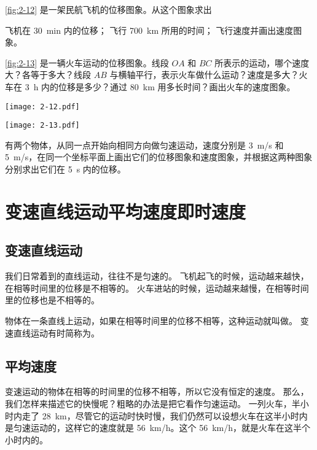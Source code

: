 \begin{Practice}
\begin{question}
  \item \cref{fig:2-12} 是一架民航飞机的位移图象。从这个图象求出
  \begin{tasks}
    \task 飞机在 \qty{30}{min} 内的位移；
    \task 飞行 \qty{700}{km} 所用的时间；
    \task 飞行速度并画出速度图象。
  \end{tasks}
  \item  \cref{fig:2-13} 是一辆火车运动的位移图象。线段 $OA$ 和 $BC$ 所表示的运动，哪个速度大？各等于多大？线段 $AB$ 与横轴平行，表示火车做什么运动？速度是多大？火车在 \qty{3}{h} 内的位移是多少？通过 \qty{80}{km} 用多长时间？画出火车的速度图象。
  \begin{figurehere}
    \begin{minipage}[b]{0.48\linewidth}
      \centering
      \texttt{[image: 2-12.pdf]}
      \caption{}\label{fig:2-12}
    \end{minipage}
    \begin{minipage}[b]{0.48\linewidth}
      \centering
      \texttt{[image: 2-13.pdf]}
      \caption{}\label{fig:2-13}
  \end{minipage}
  \end{figurehere}
  \item  有两个物体，从同一点开始向相同方向做匀速运动，速度分别是 \qty{3}{m/s} 和 \qty{5}{m/s}，在同一个坐标平面上画出它们的位移图象和速度图象，并根据这两种图象分别求出它们在 \qty{5}{s} 内的位移。
\end{question}
\end{Practice}


\section{变速直线运动\texorpdfstring{\quad}{ }平均速度\texorpdfstring{\quad}{ }即时速度}
\subsection{变速直线运动}
我们日常着到的直线运动，往往不是匀速的。
飞机起飞的时候，运动越来越快，在相等时间里的位移是不相等的。
火车进站的时候，运动越来越慢，在相等时间里的位移也是不相等的。

物体在一条直线上运动，如果在相等时间里的位移不相等，这种运动就叫做。
变速直线运动有时简称为。

\subsection{平均速度}
变速运动的物体在相等的时间里的位移不相等，所以它没有恒定的速度。
那么，我们怎样来描述它的快慢呢？粗略的办法是把它看作匀速运动。
一列火车，半小时内走了 \qty{28}{km}，尽管它的运动时快时慢，我们仍然可以设想火车在这半小时内是匀速运动的，这样它的速度就是 \qty{56}{km/h}。这个 \qty{56}{km/h}，就是火车在这半个小时内的。

